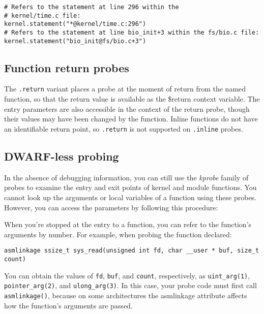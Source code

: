 \documentclass[twoside,english]{article}
\newenvironment{vindent}
{\begin{list}{}{\setlength{\listparindent}{6pt}}
\item[]}
{\end{list}}
\begin{document}
\begin{vindent}
\begin{verbatim}
# Refers to the statement at line 296 within the
# kernel/time.c file:
kernel.statement("*@kernel/time.c:296")
# Refers to the statement at line bio_init+3 within the fs/bio.c file:
kernel.statement("bio_init@fs/bio.c+3")
\end{verbatim}
\end{vindent}


\subsection{Function return probes}
The \texttt{.return} variant places a probe at the moment of return from
the named function, so that the return value is available as the \$return
context variable. The entry parameters are also accessible in the context
of the return probe, though their values may have been changed by the function.
Inline functions do not have an identifiable return point, so \texttt{.return}
is not supported on \texttt{.inline} probes.

\subsection{DWARF-less probing}

In the absence of debugging information, you can still use the
\emph{kprobe} family of probes to examine the entry and exit points of
kernel and module functions. You cannot look up the arguments or local
variables of a function using these probes. However, you can access
the parameters by following this procedure:

When you're stopped at the entry to a function, you can refer to the
function's arguments by number. For example, when probing the function
declared:

\begin{vindent}
\begin{verbatim}
asmlinkage ssize_t sys_read(unsigned int fd, char __user * buf, size_t
count)
\end{verbatim}
\end{vindent}

You can obtain the values of \texttt{fd}, \texttt{buf}, and
\texttt{count}, respectively, as \texttt{uint\_arg(1)},
\texttt{pointer\_arg(2)}, and \texttt{ulong\_arg(3)}. In this case, your
probe code must first call \texttt{asmlinkage()}, because on some
architectures the asmlinkage attribute affects how the function's
arguments are passed.
\end{document}
